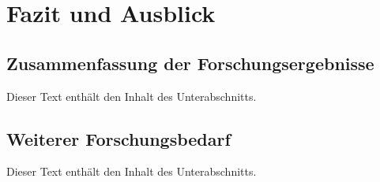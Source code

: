 \section{Fazit und Ausblick}
\label{sec:05_conclusion-and-outlook}

\subsection{Zusammenfassung der Forschungsergebnisse}
\label{subsec:05-01_summary-of-findings}

Dieser Text enthält den Inhalt des Unterabschnitts.

\subsection{Weiterer Forschungsbedarf}
\label{subsec:05-02_directions-for-future-research}

Dieser Text enthält den Inhalt des Unterabschnitts.
